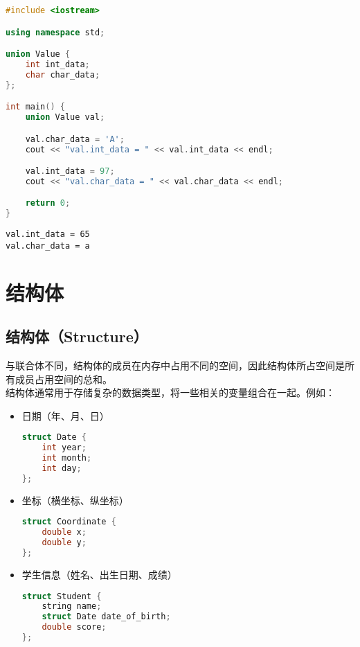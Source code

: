 
\begin{lstlisting}[language=C++]
#include <iostream>

using namespace std;

union Value {
    int int_data;
    char char_data;
};

int main() {
    union Value val;

    val.char_data = 'A';
    cout << "val.int_data = " << val.int_data << endl;

    val.int_data = 97;
    cout << "val.char_data = " << val.char_data << endl;

    return 0;
}
\end{lstlisting}

\begin{tcolorbox}
    \begin{verbatim}
val.int_data = 65
val.char_data = a
	\end{verbatim}
\end{tcolorbox}

\newpage

\section{结构体}

\subsection{结构体（Structure）}

与联合体不同，结构体的成员在内存中占用不同的空间，因此结构体所占空间是所有成员占用空间的总和。\\

结构体通常用于存储复杂的数据类型，将一些相关的变量组合在一起。例如：

\begin{itemize}
    \item 日期（年、月、日）
          \vspace{-0.5cm}
          \begin{lstlisting}[language=C++]
struct Date {
    int year;
    int month;
    int day;
};
    \end{lstlisting}

    \item 坐标（横坐标、纵坐标）
          \vspace{-0.5cm}
          \begin{lstlisting}[language=C++]
struct Coordinate {
    double x;
    double y;
};
    \end{lstlisting}

    \item 学生信息（姓名、出生日期、成绩）
          \vspace{-0.5cm}
          \begin{lstlisting}[language=C++]
struct Student {
    string name;
    struct Date date_of_birth;
    double score;
};
    \end{lstlisting}
\end{itemize}

